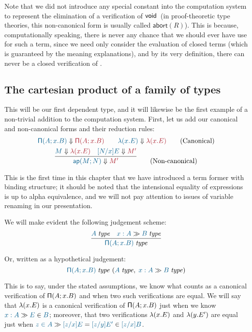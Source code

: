 Note that we did not introduce any special constant into the
computation system to represent the elimination of a verification of
$\mathsf{void}$\ (in proof-theoretic type theories, this non-canonical form
is usually called $\mathsf{abort}(R)$).  This is because,
computationally speaking, there is never any chance that we should
ever have use for such a term, since we need only consider the
evaluation of closed terms (which is guaranteed by the meaning
explanations), and by its very definition, there can never be a closed
verification of \tyvoid.

\subsection{The cartesian product of a family of types}

This will be our first dependent type, and it will likewise be the first
example of a non-trivial addition to the computation system. First, let us add
our canonical and non-canonical forms and their reduction rules:
\begin{gather*}
  \reduce{\typrod{A}{x}{B}}{\typrod{A}{x}{B}}
  \qquad
  \reduce{\lam{x}{E}}{\lam{x}{E}}
  \tag{Canonical}\\
  \infer{
    \reduce{\ap{M}{N}}{M'}
  }{
    \reduce{M}{\lam{x}{E}} &
    \reduce{[N/x]E}{M'}
  }\tag{Non-canonical}
\end{gather*}

This is the first time in this chapter that we have introduced a term former
with binding structure; it should be noted that the intensional equality of
expressions is up to alpha equivalence, and we will not pay attention to issues
of variable renaming in our presentation.

We will make evident the following judgement scheme:
\[
  \infer{
    \isset{\typrod{A}{x}{B}}
  }{
    \isset{A} &
    \sequent{x:A}{\isset{B}}
  }
\]

Or, written as a hypothetical judgement:
\[
  \hyp{\isset{\typrod{A}{x}{B}}}{\isset{A},\;\sequent{x:A}{\isset{B}}}
\]

This is to say, under the stated assumptions, we know what counts as a
canonical verification of $\mathsf{\Pi}(A;x.B)$ and when two such
verifications are equal. We will say that $\mathsf{\lambda}(x.E)$ is a canonical
verification of $\mathsf{\Pi}(A;x.B)$ just when we know
$\sequent{x:A}{\ver{E}{B}}$; moreover, that two verifications
$\mathsf{\lambda}(x.E)$ and $\mathsf{\lambda}(y.E')$ are equal just when
$\sequent{\ver{z}{A}}{\ever{[z/x]E}{[z/y]E'}{[z/x]B}}$.

